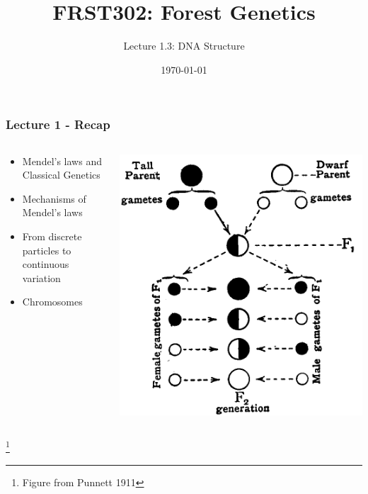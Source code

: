 \documentclass{beamer}
\title{\Huge FRST302: Forest Genetics}
\author{\Large Lecture 1.3: DNA Structure}
\date{\today}
\newcommand\blfootnote[1]{%
	\begingroup
	\renewcommand\thefootnote{}\footnote{#1}%
	\addtocounter{footnote}{-1}%
	\endgroup
}
\begin{document}
	\maketitle
	
	
	
	
	\begin{frame}
		\frametitle{Lecture 1 - Recap}
		\begin{columns}
			\begin{column}{0.5\textwidth}
				\begin{itemize}
			\item Mendel's laws and Classical Genetics
			\item Mechanisms of Mendel's laws
			\item From discrete particles to continuous variation
			\item Chromosomes
				\end{itemize}
			\end{column}
			\begin{column}{0.5\textwidth}
				
	\includegraphics[keepaspectratio, width  =\textwidth]{img/Pgen_to_F2}
			\end{column}
		\end{columns}

			\blfootnote{Figure from Punnett 1911}
			
	\end{frame}
	
\end{document}
